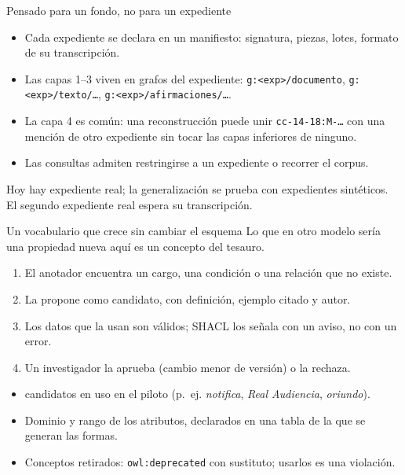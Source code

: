 \documentclass[aspectratio=169,11pt]{beamer}
\newcommand{\ttt}[1]{\texttt{\small #1}}
\newcommand{\cifra}[1]{\textbf{\alert{#1}}}
\begin{document}
\begin{frame}{Pensado para un fondo, no para un expediente}
\begin{itemize}
\item Cada expediente se declara en un \alert{manifiesto}: signatura, piezas, lotes, formato de su transcripción.
\item Las capas 1--3 viven en grafos del expediente: \ttt{g:<exp>/documento}, \ttt{g:<exp>/texto/…},
      \ttt{g:<exp>/afirmaciones/…}.
\item La capa 4 es común: una reconstrucción puede unir \ttt{cc-14-18:M-…} con una mención de \alert{otro
      expediente} sin tocar las capas inferiores de ninguno.
\item Las consultas admiten restringirse a un expediente o recorrer el corpus.
\end{itemize}
\medskip
Hoy hay \cifra{\cifraExpedientes} expediente real; la generalización se prueba con expedientes sintéticos. El segundo
expediente real espera su transcripción.
\end{frame}

\begin{frame}{Un vocabulario que crece sin cambiar el esquema}
Lo que en otro modelo sería una propiedad nueva aquí es un \alert{concepto} del tesauro.
\begin{enumerate}
\item El anotador encuentra un cargo, una condición o una relación que no existe.
\item La propone como \alert{candidato}, con definición, ejemplo citado y autor.
\item Los datos que la usan son válidos; SHACL los señala con un \alert{aviso}, no con un error.
\item Un investigador la aprueba (cambio menor de versión) o la rechaza.
\end{enumerate}
\medskip
\begin{itemize}
\item \cifra{\cifraCandidatos} candidatos en uso en el piloto (p.~ej. \emph{notifica}, \emph{Real Audiencia}, \emph{oriundo}).
\item Dominio y rango de los \cifra{\cifraAtributos} atributos, declarados en una tabla de la que se generan las formas.
\item Conceptos retirados: \ttt{owl:deprecated} con sustituto; usarlos es una violación.
\end{itemize}
\end{frame}
\end{document}
